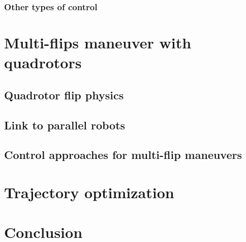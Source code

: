 \documentclass{thesisreport}
\begin{document}
 \subsection{Other types of control}
 
 \chapter{Multi-flips maneuver with quadrotors}
 
 \section{Quadrotor flip physics}
 
 \section{Link to parallel robots}
 
 \section{Control approaches for multi-flip maneuvers}
  
 \chapter{Trajectory optimization} 
 
 \chapter*{Conclusion}
 
 
 
 


 \nocite{*}
 
 


 
\end{document}
